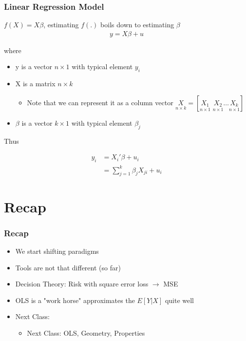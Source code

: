 \documentclass[
  shownotes,
  xcolor={svgnames},
  hyperref={colorlinks,citecolor=DarkBlue,linkcolor=DarkRed,urlcolor=DarkBlue}
  , aspectratio=169]{beamer}
\begin{document}
\begin{frame}
\frametitle{Linear Regression Model}
\bigskip
$f(X)=X\beta$, estimating $f(.)$ boils down to estimating $\beta$
\begin{align}
y = X \beta +u
\end{align}

where 
\begin{itemize}
  \item y is a vector $n \times 1$ with typical element $y_i$
  \item X is a matrix $n \times k$ 
  \begin{itemize}
    \tiny
      \item Note that we can represent it as a column vector $\underset{n\times k}{X}=[\underset{n\times 1}{X_1}\,\,\underset{n\times 1}{X_2}\dots \underset{n\times 1}{X_k}] $
  \end{itemize}
  \item $\beta$ is a vector $k \times 1$ with typical element $\beta_j$
\end{itemize}

\bigskip
Thus 

\begin{align}
y_i &= X_i' \beta +u_i  \\ \nonumber
    &= \sum_{j=1}^k \beta_j X_{ji} +u_i
\end{align}

\end{frame}


\section{Recap}
\begin{frame}
\frametitle{Recap}

\begin{itemize}
    \item We start shifting paradigms
    \medskip
    \item Tools are not that different (so far)
    \medskip
    \item Decision Theory: Risk with square error loss $\rightarrow$ MSE
    \medskip
    \item OLS is a "work horse" approximates the $E[Y|X]$ quite well 
    \medskip
    \item Next Class:
    \medskip
    \begin{itemize}
    \item  Next Class: OLS, Geometry, Properties
    \end{itemize}
     
\end{itemize}
\end{frame}
\end{document}
